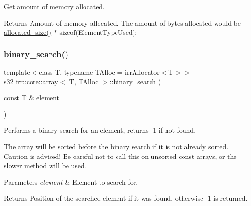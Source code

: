 Get amount of memory allocated. 

\begin{DoxyReturn}{Returns}
Amount of memory allocated. The amount of bytes allocated would be \hyperlink{classirr_1_1core_1_1array_a21e5b20b7a56ba174b19b6c36c78a14b}{allocated\+\_\+size()} $\ast$ sizeof(\+Element\+Type\+Used); 
\end{DoxyReturn}
\mbox{\label{classirr_1_1core_1_1array_a35412f669b983eaaf3792b82966db24a}} 
\subsubsection{\texorpdfstring{binary\+\_\+search()}{binary\_search()}\hspace{0.1cm}{\footnotesize\ttfamily [1/3]}}
{\footnotesize\ttfamily template$<$class T, typename T\+Alloc = irr\+Allocator$<$\+T$>$$>$ \\
\hyperlink{namespaceirr_ac66849b7a6ed16e30ebede579f9b47c6}{s32} \hyperlink{classirr_1_1core_1_1array}{irr\+::core\+::array}$<$ T, T\+Alloc $>$\+::binary\+\_\+search (\begin{DoxyParamCaption}\item[{const T \&}]{element }\end{DoxyParamCaption})\hspace{0.3cm}{\ttfamily [inline]}}



Performs a binary search for an element, returns -\/1 if not found. 

The array will be sorted before the binary search if it is not already sorted. Caution is advised! Be careful not to call this on unsorted const arrays, or the slower method will be used. 
\begin{DoxyParams}{Parameters}
{\em element} & Element to search for. \\
\hline
\end{DoxyParams}
\begin{DoxyReturn}{Returns}
Position of the searched element if it was found, otherwise -\/1 is returned. 
\end{DoxyReturn}
\mbox{\label{classirr_1_1core_1_1array_aec40f807c683671067d52e83d7b72a82}} 

